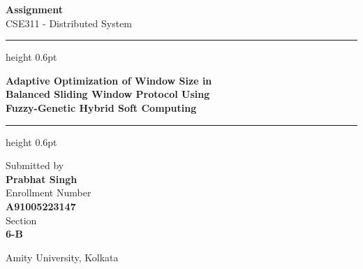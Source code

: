 \documentclass[12pt, a4paper]{article}
\begin{document}

\begin{center}

\vspace*{2cm}

{\Large\textbf{Assignment}}\\[0.4cm]
{\Large CSE311 - Distributed System}

\vspace{1.5cm}
\hrule height 0.6pt
\vspace{0.5cm}

{\LARGE\textbf{Adaptive Optimization of Window Size in\\[0.3cm]
Balanced Sliding Window Protocol Using\\[0.3cm]
Fuzzy-Genetic Hybrid Soft Computing}}

\vspace{0.5cm}
\hrule height 0.6pt

\vspace{3cm}

{\large Submitted by}\\[0.6cm]

{\LARGE \textbf{Prabhat Singh}}\\[0.6cm]

{\large Enrollment Number}\\[0.3cm]
{\large \textbf{A91005223147}}\\[0.6cm]

{\large Section}\\[0.3cm]
{\large \textbf{6-B}}

\vspace{3cm}

{\large Amity University, Kolkata}\\[0.3cm]
{\large \the\year}

\end{center}
\end{document}
